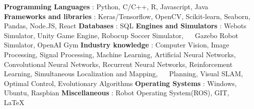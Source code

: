 \begin{cventries}  
\skillentry
    {
    \bullet \space \textbf{Programming Languages} : Python, C/C++, R, Javascript, Java \newline
    \bullet \space \textbf{Frameworks and libraries} : Keras/Tensorflow, OpenCV, Scikit-learn, Seaborn, Pandas, Node.JS, React \newline
    \bullet \space \textbf{Databases} : SQL \newline
    \bullet \space \textbf{Engines and Simulators} : Webots Simulator, Unity Game Engine, Robocup Soccer Simulator, \newline $\quad$ Gazebo Robot Simulator, OpenAI Gym \newline
    \bullet \space \textbf{Industry knowledge} : Computer Vision, Image Processing, Signal Processing, Machine Learning, Artificial Neural Networks, \newline $\quad$ Convolutional Neural Networks, Recurrent Neural Networks, Reinforcement Learning, Simultaneous Localization and Mapping, \newline $\quad$ Planning, Visual SLAM, Optimal Control, Evolutionary Algorithms   \newline
    \bullet \space \textbf{Operating Systems} : Windows, Ubuntu, Raspbian \newline
    \bullet \space \textbf{Miscellaneous} : Robot Operating System(ROS), GIT, LaTeX
    }
\end{cventries}
